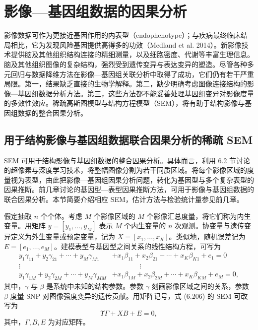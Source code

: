 \section{影像—基因组数据的因果分析}

影像数据可作为更接近基因作用的内表型（endophenotype）；与疾病最终临床结局相比，它为发现风险基因提供高得多的功效（Medland et al. 2014）。新影像技术提供脑及其他组织结构连接的精细测量，以及细胞密度、代谢等丰富生理信息。脑及其他组织图像的复杂结构，强烈受到遗传变异与表达变异的塑造。尽管各种多元回归与数据降维方法在影像—基因组关联分析中取得了成功，它们仍有若干严重局限。第一，结果缺乏直接的生物学解释。第二，缺少明确考虑图像连接结构的影像—基因组数据分析方法。第三，这些方法都不能妥善处理基因组变异对影像度量的多效性效应。稀疏高斯图模型与结构方程模型（SEM），将有助于结构影像与基因组数据的整合因果分析。

\subsection{用于结构影像与基因组数据联合因果分析的稀疏 SEM}

SEM 可用于结构影像与基因组数据的整合因果分析。具体而言，利用 6.2 节讨论的超像素与深度学习技术，将整幅图像分割为若干同质区域。将每个影像区域的度量视为表型，由此把影像—基因组因果分析问题，转化为基因型与多个复杂表型的因果推断。前几章讨论的基因型—表型因果推断方法，可用于影像与基因组数据的联合因果分析。本节简要介绍相应 SEM，估计方法与检验统计量参见前几章。

假定抽取 $n$ 个个体。考虑 $M$ 个影像区域的 $M$ 个影像汇总度量，将它们称为内生变量。用矩阵 $y=[y_1,\ldots,y_M]$ 表示 $M$ 个内生变量的 $n$ 次观测。协变量与遗传变异定义为外生变量或预定变量，记为 $X=[x_1,\ldots,x_K]$。类似地，随机误差记为 $E=[e_1,\ldots,e_M]$。建模表型与基因型之间关系的线性结构方程，可写为
\begin{equation}
\begin{aligned}
y_1\gamma_{11}+y_2\gamma_{21}+\cdots+y_M\gamma_{M1}&+x_1\beta_{11}+x_2\beta_{21}+\cdots+x_K\beta_{K1}+e_1=0\\
\vdots\qquad\qquad&\qquad\qquad\vdots\\
y_1\gamma_{1M}+y_2\gamma_{2M}+\cdots+y_M\gamma_{MM}&+x_1\beta_{1M}+x_2\beta_{2M}+\cdots+x_K\beta_{KM}+e_M=0,
\end{aligned}\tag{6.206}
\end{equation}
其中，$\gamma$ 与 $\beta$ 是系统中未知的结构参数。参数 $\gamma$ 刻画影像区域之间的关系，参数 $\beta$ 度量 SNP 对图像强度变异的遗传贡献。用矩阵记号，式 (6.206) 的 SEM 可改写为
\begin{equation}
\Upsilon\Gamma+XB+E=0,
\tag{6.207}
\end{equation}
其中，$\Gamma,B,E$ 为对应矩阵。

